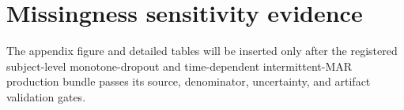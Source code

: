 \documentclass{article}
\begin{document}


\section{Missingness sensitivity evidence}

The appendix figure and detailed tables will be inserted only after the
registered subject-level monotone-dropout and time-dependent intermittent-MAR
production bundle passes its source, denominator, uncertainty, and artifact
validation gates.


\newpage


\end{document}
